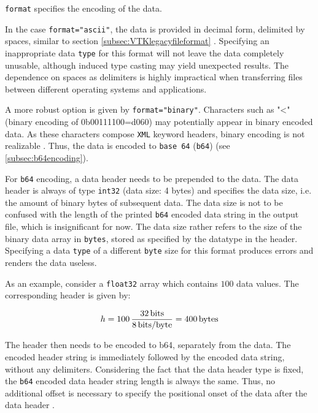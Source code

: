 \bigbreak
\lstinline[language=XML]{format} specifies the encoding of the data.

\bigbreak
In the case \lstinline[language=XML]{format="ascii"}, the data is provided in decimal form, delimited by spaces, similar to section \ref{subsec:VTKlegacyfileformat} \cite{Bun09}. Specifying an inappropriate data \lstinline[language=XML]{type} for this format will not leave the data completely unusable, although induced type casting may yield unexpected results. The dependence on spaces as delimiters is highly impractical when transferring files between different operating systems and applications. 

\bigbreak
A more robust option is given by \lstinline[language=XML]{format="binary"}. Characters such as "<" (binary encoding of 0b00111100=d060) may potentially appear in binary encoded data. As these characters compose \texttt{XML} keyword headers, binary encoding is not realizable \cite{Bun09}. Thus, the data is encoded to \texttt{base 64} (\texttt{b64}) (see \ref{subsec:b64encoding}). 

\bigbreak
For \texttt{b64} encoding, a data header needs to be prepended to the data. The data header is always of type \lstinline[language=C]{int32} (data size: 4 bytes) and specifies the data size, i.e. the amount of binary bytes of subsequent data. The data size is not to be confused with the length of the printed \texttt{b64} encoded data string in the output file, which is insignificant for now. The data size rather refers to the size of the binary data array in \lstinline[language=C]{bytes}, stored as specified by the datatype in the header. Specifying a data \lstinline[language=XML]{type} of a different \texttt{byte} size for this format produces errors and renders the data useless.

\bigbreak
As an example, consider a \lstinline[language=C]{float32} array which contains $100$ data values. The corresponding header is given by:

\begin{equation}
\label{eq:b64inlineex}
    h=100\,\frac{32\,{\rm bits}}{8\,{\rm bits}/{\rm byte}}=400\,{\rm bytes}
\end{equation}

\bigbreak
The header then needs to be encoded to b64, separately from the data. The encoded header string is immediately followed by the encoded data string, without any delimiters. Considering the fact that the data header type is fixed, the \texttt{b64} encoded data header string length is always the same. Thus, no additional offset is necessary to specify the positional onset of the data after the data header \cite{Bun09}.


